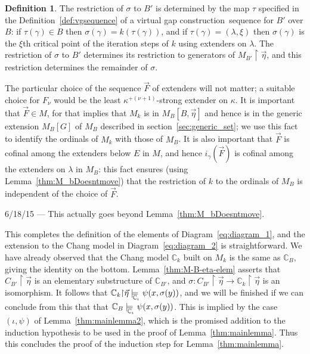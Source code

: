 \documentclass[
twoside,
]{article}
\theoremstyle{definition}
\newtheorem{definition}[theorem]{Definition}
\theoremstyle{remark}
\newcommand{\vg}{virtual gap construction}
\newcommand{\etarestrict}{\restrict}
\newcommand{\modelsCi}{\models_{\!\!\!\!\!\lower.7ex\hbox{$\scriptstyle\chang_\iota$}}}\newcommand{\fvia}[4]{f^{#1}_{#2(#3)#4}}
\newcommand{\xre}{\etarestrict\vec\eta{}}
\newcommand{\restrict}{{\upharpoonright}}
\newcommand\chang{\mathbb{C}}
\begin{document}
\begin{definition}  
  \label{def:sigma}
  The restriction of $\sigma$ to $B'$ is determined by the map
  $\tau$ specified in the Definition~\ref{def:vgsequence} of a \vg\
  sequence for $B'$ over $B$: if $\tau(\gamma)\in B$ then
  $\sigma(\gamma)=k(\tau(\gamma))$, and if
  $\tau(\gamma)=(\lambda,\xi)$ then $\sigma(\gamma)$ is the
  $\xi$th critical point of the iteration steps of $k$ using  extenders on $\lambda$.
  The restriction of $\sigma$ to $B'$ determines its restriction
  to generators of $M_{B'}\xre$, and this restriction  determines
  the remainder of $\sigma$.
\end{definition}

The particular choice of the sequence $\vec F$ of extenders will not
matter; a suitable choice for $F_\nu$ would be the least
$\kappa^{+(\nu+1)}$-strong   extender on $\kappa$.
It is important that $\vec F\in M$, for that implies that
$M_k$ is in $M_B[B,\vec\eta]$ and hence is in the generic
extension $M_B[G]$ of $M_B$ described in
section~\ref{sec:generic_set}; we  use this fact to identify the ordinals
of $M_k$ with those of $M_B$.    It is also important that
$\vec F$
is cofinal among the extenders below $E$  in $M$, and hence
$i_{\gamma}(\vec F)$ is cofinal among  the extenders on $\lambda$
in $M_B$:  this fact ensures (using
Lemma~\ref{thm:M_bDoesntmove})
that the restriction of $k$ to  the ordinals of $M_B$ is
independent of the choice of $\vec F$.    

\begin{todoenv}
{6/18/15  --- This actually goes beyond
    Lemma~\ref{thm:M_bDoesntmove}.}
\end{todoenv}
This completes the definition of the elements of
Diagram~\eqref{eq:diagram_1}, and the extension to the Chang model in 
Diagram~\eqref{eq:diagram_2} is straightforward.   
We have already observed that the Chang model $\chang_k$ built on
$M_k$ is the same as $\chang_B$, giving the identity  on the
bottom.    Lemma~\ref{thm:M-B-eta-elem} asserts that $C_{B'}\xre$ is
an elementary substructure of $\chang_{B'}$, and $\sigma\colon
C_{B'}\xre\to \chang_{k}\xre$ is an isomorphism.    It follows that
$\chang_{k}\xre\modelsCi \psi(x,\sigma(y))$, and
we will be finished if we can conclude from this that  that
$\chang_{B}\modelsCi \psi(x,\sigma(y))$.   This is implied by the case
$(\iota,\psi)$ of 
Lemma~\ref{thm:mainlemma2}, which is the promised addition to the induction
hypothesis to be used in  the proof of Lemma~\ref{thm:mainlemma}.   Thus this
concludes the proof of the induction step for
Lemma~\ref{thm:mainlemma}. 
\end{document}
